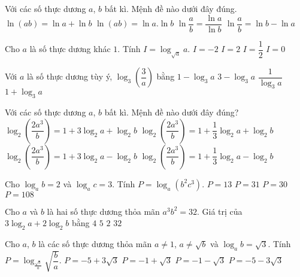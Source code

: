 \begin{ex}%
	Với các số thực dương $a$, $b$ bất kì. Mệnh đề nào dưới đây đúng.
	\choice
	{\True $\ln \left(ab\right)=\ln a+\ln b$}
	{$\ln \left(ab\right)=\ln a.\ln b$}
	{$\ln \dfrac{a}{b}=\dfrac{\ln a}{\ln b}$}
	{$\ln \dfrac{a}{b}=\ln b-\ln a$}
\end{ex}
\begin{ex}%
	[Mã 123 2017]
	Cho $a$ là số thực dương khác $1$. Tính $I=\log_{\sqrt{a}}a.$ 
	\choice
	{$ I=-2$}
	{\True $ I=2$}
	{$ I=\dfrac{1}{2}$}
	{$ I=0$}
\end{ex}
\begin{ex}%
	[Mã 104 2018]
	Với $a$ là số thực dương tùy ý, $\log_3\left(\dfrac{3}{a}\right)$ bằng
	\choice
	{\True $1-\log_3a$}
	{$3-\log_3a$}
	{$\dfrac{1}{\log_3a}$}
	{$1+\log_3a$}
\end{ex}
\begin{ex}%
	Với các số thực dương $a$, $b$ bất kì. Mệnh đề nào dưới đây đúng?
	\choice
	{\True $\log_2\left(\dfrac{2a^3}{b}\right)=1+3\log_2a+\log_2b$}
	{$\log_2\left(\dfrac{2a^3}{b}\right)=1+\dfrac{1}{3}{\log_2}a+\log_2b$}
	{$\log_2\left(\dfrac{2a^3}{b}\right)=1+3\log_2a-\log_2b$}
	{$\log_2\left(\dfrac{2a^3}{b}\right)=1+\dfrac{1}{3}{\log_2}a-\log_2b$}
\end{ex}
\begin{ex}%
	[Mã 110 2017]
	Cho $\log_ab=2$ và $\log_ac=3$. Tính $P=\log_a\left(b^2c^3\right)$.
	\choice
	{\True $P=13$}
	{$P=31$}
	{$P=30$}
	{$P=108$}
\end{ex}
\begin{ex}%
	[Mã 102 2019]
	Cho $a$ và $b$ là hai số thực dương thỏa mãn $a^3b^2=32$. Giá trị của $3\log_2a+2\log_2b$ bằng
	\choice
	{$4$}
	{\True $5$}
	{$2$}
	{$32$}
\end{ex}
\begin{ex}%
	[Đề Tham Khảo 2017]
	Cho $a$, $b$ là các số thực dương thỏa mãn $a\ne 1$, $a\ne\sqrt{b}$ và $\log_ab=\sqrt{3}$. Tính $P=\log_{\frac{\sqrt{b}}{a}}\sqrt{\dfrac{b}{a}}$.
	\choice
	{$P=-5+3\sqrt{3}$}
	{$P=-1+\sqrt{3}$}
	{\True $P=-1-\sqrt{3}$}
	{$P=-5-3\sqrt{3}$}
\end{ex}
